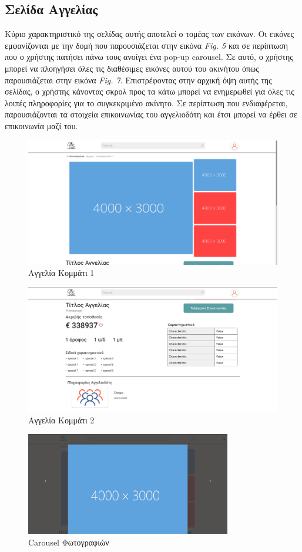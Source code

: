 \documentclass{acmart}
\begin{document}
\subsection*{Σελίδα Αγγελίας}
Κύριο χαρακτηριστικό της σελίδας αυτής αποτελεί ο τομέας των εικόνων. Οι εικόνες εμφανίζονται με την δομή που παρουσιάζεται στην εικόνα \emph{Fig. 5} και σε περίπτωση που ο χρήστης πατήσει πάνω τους ανοίγει ένα pop-up carousel. Σε αυτό, ο χρήστης μπορεί να πλοηγήσει όλες τις διαθέσιμες εικόνες αυτού του ακινήτου όπως παρουσιάζεται στην εικόνα \emph{Fig. 7}.
Επιστρέφοντας στην αρχική όψη αυτής της σελίδας, ο χρήστης κάνοντας σκρολ προς τα κάτω μπορεί να ενημερωθεί για όλες τις λοιπές πληροφορίες για το συγκεκριμένο ακίνητο. Σε περίπτωση που ενδιαφέρεται, παρουσιάζονται τα στοιχεία επικοινωνίας του αγγελιοδότη και έτσι μπορεί να έρθει σε επικοινωνία μαζί του.
\begin{figure}[H]
       \includegraphics[width=\textwidth]{listing_page1.png}
       \caption{Αγγελία Κομμάτι 1}
       \label{fig:event}
\end{figure}
\begin{figure}[H]
       \includegraphics[width=\textwidth]{listing_page2.png}
       \caption{Αγγελία Κομμάτι 2}
       \label{fig:event}
\end{figure}
\begin{figure}[H]
       \includegraphics[width=0.8\textwidth]{listing_carousel.png}
       \caption{Carousel Φωτογραφιών}
       \label{fig:event}
\end{figure}
\end{document}
